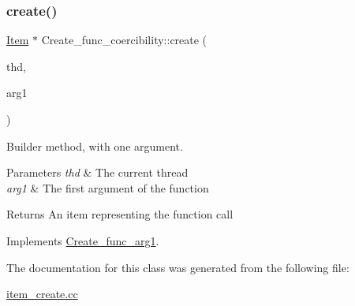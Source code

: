 \subsubsection{\texorpdfstring{create()}{create()}}
{\footnotesize\ttfamily \mbox{\hyperlink{classItem}{Item}} $\ast$ Create\+\_\+func\+\_\+coercibility\+::create (\begin{DoxyParamCaption}\item[{T\+HD $\ast$}]{thd,  }\item[{\mbox{\hyperlink{classItem}{Item}} $\ast$}]{arg1 }\end{DoxyParamCaption})\hspace{0.3cm}{\ttfamily [virtual]}}

Builder method, with one argument. 
\begin{DoxyParams}{Parameters}
{\em thd} & The current thread \\
\hline
{\em arg1} & The first argument of the function \\
\hline
\end{DoxyParams}
\begin{DoxyReturn}{Returns}
An item representing the function call 
\end{DoxyReturn}


Implements \mbox{\hyperlink{classCreate__func__arg1_a3e9a98f755cd82c3e762e334c955a8c9}{Create\+\_\+func\+\_\+arg1}}.



The documentation for this class was generated from the following file\+:\begin{DoxyCompactItemize}
\item 
\mbox{\hyperlink{item__create_8cc}{item\+\_\+create.\+cc}}\end{DoxyCompactItemize}

